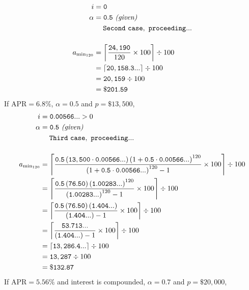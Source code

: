 \documentclass[12pt,letterpaper,oneside]{article}
\theoremstyle{remark} %
\begin{document}
	\begin{align*}
	i&=\mathtt{0}\\
	\alpha&=\mathtt{0.5}\ \textit{(given)}\\
	&\quad\;\mathtt{Second\ case,\ proceeding...}\\[12pt]
	a_{\rm{min_{120}}}&=\left\lceil{\frac{\mathtt{24,190}}{120}\times 100}\right\rceil\div 100\\
	&=\left\lceil{\mathtt{20,158.3...}}\right\rceil\div 100\\
	&=\mathtt{20,159}\div 100\\
	&=\mathtt{\$201.59}
	\end{align*}
	\newpage
	\newcommand{\base}{\left(1+\mathtt{0.5}\cdot\mathtt{0.00566...}\right)}
	If $\mbox{APR}=6.8\%$, $\alpha=0.5$ and $p=\$13,500$,
	\begin{align*}
	i&=\mathtt{0.00566...}>0\\
	\alpha&=\mathtt{0.5}\ \textit{(given)}\\
	&\quad\;\mathtt{Third\ case,\ proceeding...}\\[12pt]
	a_{\rm{min_{120}}}&=\left\lceil{\frac{\mathtt{0.5}\left(\mathtt{13,500}\cdot\mathtt{0.00566...}\right)\base^{120}}{\base^{120}-1}\times 100}\right\rceil\div 100\\
	&=\left\lceil{\frac{\mathtt{0.5}\left(\mathtt{76.50}\right)\left(\mathtt{1.00283...}\right)^{120}}{\left(\mathtt{1.00283...}\right)^{120}-1}\times 100}\right\rceil\div 100\\
	&=\left\lceil{\frac{\mathtt{0.5}\left(\mathtt{76.50}\right)\left(\mathtt{1.404...}\right)}{\left(\mathtt{1.404...}\right)-1}\times 100}\right\rceil\div 100\\
	&=\left\lceil{\frac{\mathtt{53.713...}}{\left(\mathtt{1.404...}\right)-1}\times 100}\right\rceil\div 100\\
	&=\left\lceil{\mathtt{13,286.4...}}\right\rceil\div 100\\
	&=\mathtt{13,287}\div 100\\
	&=\mathtt{\$132.87}
	\end{align*}
	\renewcommand{\base}{\left(1+\mathtt{0.7}\cdot\mathtt{0.00464...}\right)}
	If $\mbox{APR}=5.56\%$ and interest is compounded, $\alpha=0.7$ and $p=\$20,000$,
\end{document}

